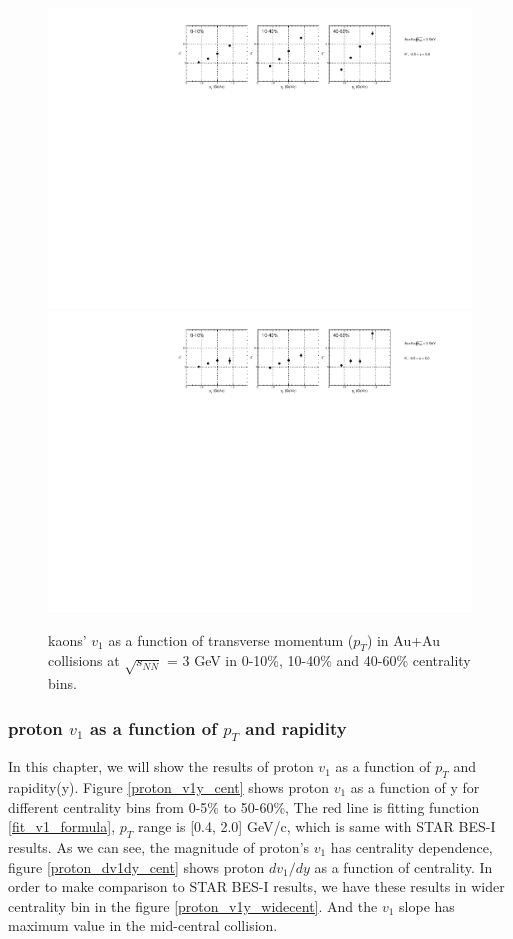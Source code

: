 \begin{figure}[h]
\includegraphics[scale=0.5]{chapter3/fig/v1ptpikp/kaonp_v1pt_wide_cent.pdf}
\includegraphics[scale=0.5]{chapter3/fig/v1ptpikp/kaonm_v1pt_wide_cent.pdf}
\caption{kaons' $v_{1}$ as a function of transverse momentum ($p_{T}$) in Au+Au collisions at $\sqrt{s_{NN}}$ = 3 GeV in 0-10\%, 10-40\% and 40-60\% centrality bins.}
\label{kaon_v1pt_widecent}
\end{figure}

\clearpage

\subsubsection{proton $v_{1}$ as a function of $p_{T}$ and rapidity}
In this chapter, we will show the results of proton $v_{1}$ as a function of $p_{T}$ and rapidity(y). 
Figure \ref{proton_v1y_cent} shows proton $v_{1}$ as a function of y for different centrality bins from 0-5\% to 50-60\%, The red line is fitting function \ref{fit_v1_formula}, $p_{T}$ range is [0.4, 2.0] GeV/c, which is same with STAR BES-I results. As we can see, the magnitude of proton's $v_{1}$ has centrality dependence, figure \ref{proton_dv1dy_cent} shows proton $dv_{1}/dy$ as a function of centrality. In order to make comparison to STAR BES-I results, we have these results in wider centrality bin in the figure \ref{proton_v1y_widecent}. And the $v_{1}$ slope has maximum value in the mid-central collision.


